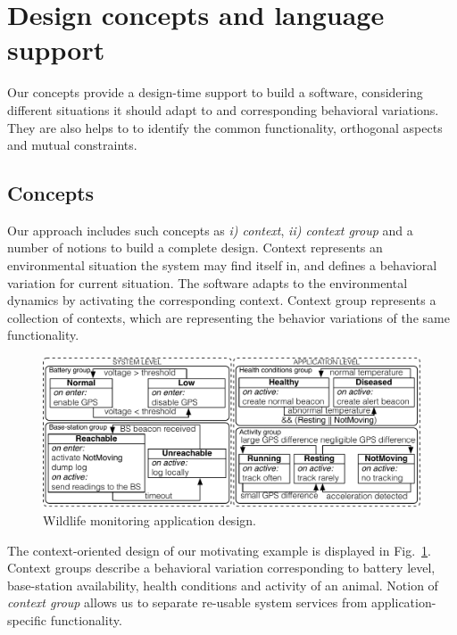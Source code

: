 \section{Design concepts and language support}

Our concepts provide a design-time support to build a software, considering
different situations it should adapt to and corresponding behavioral variations.
They are also helps to to identify the common functionality, orthogonal aspects
and mutual constraints.

\subsection{Concepts}\label{subsec:concepts}

Our approach includes such concepts as \emph{i) context}, \emph{ii) context
group} and a number of notions to build a complete design. Context represents an
environmental situation the system may find itself in, and defines a behavioral
variation for current situation. The software adapts to the environmental
dynamics by activating the corresponding context. Context group represents a
collection of contexts, which are representing the behavior variations of the
same functionality.

\begin{figure}
\begin{center}
\includegraphics[scale=.45]{imgs/wildlifetracking}
\vspace{-4mm}
\caption{Wildlife monitoring application design.}
  \label{fig:design}
\vspace{-6mm}
\end{center}
\end{figure}

The context-oriented design of our motivating example is displayed in
Fig.~\ref{fig:design}. Context groups describe a behavioral variation
corresponding to battery level, base-station availability, health conditions and
activity of an animal. Notion of \emph{context group} allows us to separate
re-usable system services from application-specific functionality.


